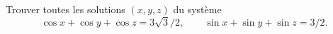 Trouver toutes les solutions $(x, y, z)$ du système
\[ \cos x + \cos y + \cos z = 3\sqrt{3}/2,\qquad \sin x + \sin y + \sin z = 3/2. \]
